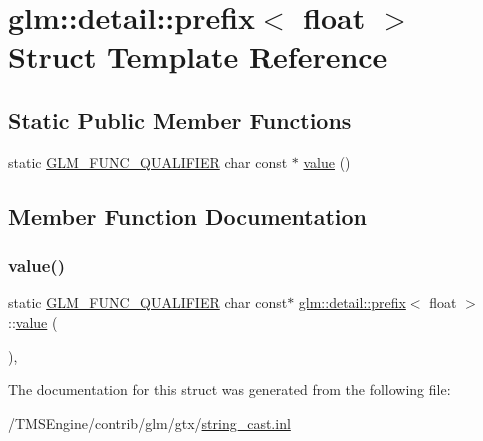 \hypertarget{structglm_1_1detail_1_1prefix_3_01float_01_4}{}\section{glm\+:\+:detail\+:\+:prefix$<$ float $>$ Struct Template Reference}
\label{structglm_1_1detail_1_1prefix_3_01float_01_4}
\subsection*{Static Public Member Functions}
\begin{DoxyCompactItemize}
\item 
static \hyperlink{setup_8hpp_a33fdea6f91c5f834105f7415e2a64407}{G\+L\+M\+\_\+\+F\+U\+N\+C\+\_\+\+Q\+U\+A\+L\+I\+F\+I\+ER} char const  $\ast$ \hyperlink{structglm_1_1detail_1_1prefix_3_01float_01_4_a106cde8d6d62001a05cbf21367467591}{value} ()
\end{DoxyCompactItemize}


\subsection{Member Function Documentation}
\mbox{\label{structglm_1_1detail_1_1prefix_3_01float_01_4_a106cde8d6d62001a05cbf21367467591}} 
\subsubsection{\texorpdfstring{value()}{value()}}
{\footnotesize\ttfamily static \hyperlink{setup_8hpp_a33fdea6f91c5f834105f7415e2a64407}{G\+L\+M\+\_\+\+F\+U\+N\+C\+\_\+\+Q\+U\+A\+L\+I\+F\+I\+ER} char const$\ast$ \hyperlink{structglm_1_1detail_1_1prefix}{glm\+::detail\+::prefix}$<$ float $>$\+::\hyperlink{_s_d_l__opengl__glext_8h_a8ad81492d410ff2ac11f754f4042150f}{value} (\begin{DoxyParamCaption}{ }\end{DoxyParamCaption})\hspace{0.3cm}{\ttfamily [inline]}, {\ttfamily [static]}}



The documentation for this struct was generated from the following file\+:\begin{DoxyCompactItemize}
\item 
/\+T\+M\+S\+Engine/contrib/glm/gtx/\hyperlink{string__cast_8inl}{string\+\_\+cast.\+inl}\end{DoxyCompactItemize}
